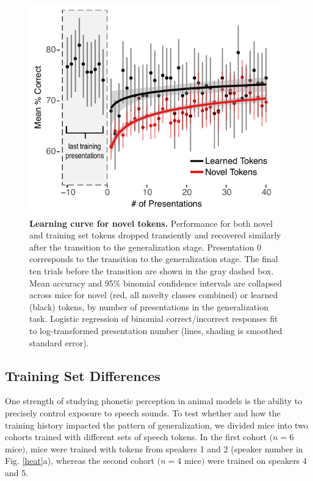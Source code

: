 \begin{figure}[h]
\includegraphics[width=4.3in]{speech/figures/Figure3.pdf}
\caption{\textbf{Learning curve for novel tokens.} Performance for both novel and training set tokens dropped transiently and recovered similarly after the transition to the generalization stage. Presentation 0 corresponds to the transition to the generalization stage. The final ten trials before the transition are shown in the gray dashed box. Mean accuracy and 95\% binomial confidence intervals are collapsed across mice for novel (red, all novelty classes combined) or learned (black) tokens, by number of presentations in the generalization task. Logistic regression of binomial correct/incorrect responses fit to log-transformed presentation number (lines, shading is smoothed standard error).}
\label{lc}
\end{figure}

\subsection{Training Set Differences}

%
%
%
%
One strength of studying phonetic perception in animal models is the ability to precisely control exposure to speech sounds. To test whether and how the training history impacted the pattern of generalization, we divided mice into two cohorts trained with different sets of speech tokens. In the first cohort $ (n = 6$ mice$) $, mice were trained with tokens from speakers 1 and 2 (speaker number in Fig. \ref{heat}a), whereas the second cohort $ (n = 4$ mice$) $ were trained on speakers 4 and 5.

